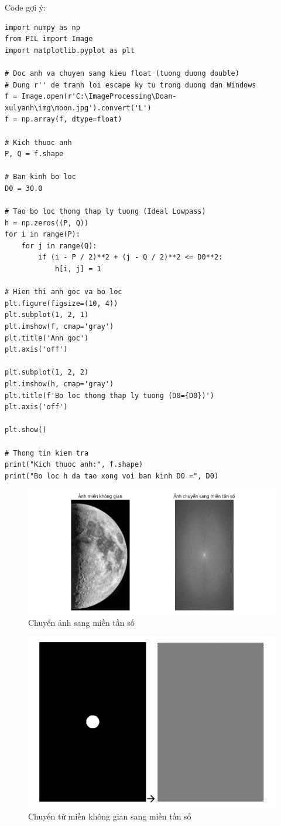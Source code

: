 \documentclass[12pt,a4paper]{report}
\numberwithin{equation}{section}
\theoremstyle{definition} %
\begin{document}
Code gợi ý: 
\begin{lstlisting}
import numpy as np
from PIL import Image
import matplotlib.pyplot as plt

# Doc anh va chuyen sang kieu float (tuong duong double)
# Dung r'' de tranh loi escape ky tu trong duong dan Windows
f = Image.open(r'C:\ImageProcessing\Doan-xulyanh\img\moon.jpg').convert('L')
f = np.array(f, dtype=float)

# Kich thuoc anh
P, Q = f.shape

# Ban kinh bo loc
D0 = 30.0

# Tao bo loc thong thap ly tuong (Ideal Lowpass)
h = np.zeros((P, Q))
for i in range(P):
    for j in range(Q):
        if (i - P / 2)**2 + (j - Q / 2)**2 <= D0**2:
            h[i, j] = 1

# Hien thi anh goc va bo loc
plt.figure(figsize=(10, 4))
plt.subplot(1, 2, 1)
plt.imshow(f, cmap='gray')
plt.title('Anh goc')
plt.axis('off')

plt.subplot(1, 2, 2)
plt.imshow(h, cmap='gray')
plt.title(f'Bo loc thong thap ly tuong (D0={D0})')
plt.axis('off')

plt.show()

# Thong tin kiem tra
print("Kich thuoc anh:", f.shape)
print("Bo loc h da tao xong voi ban kinh D0 =", D0)

\end{lstlisting}
\begin{figure}[H]
\centering
\includegraphics[width=0.9\linewidth]{img/moonFrequencydomain.png}
\caption{Chuyển ảnh sang miền tần số}
\label{fig113}
\end{figure}
\begin{figure}[H]
\centering
\includegraphics[width=0.7\linewidth]{img/mienKG_mienTS.png}
\caption{Chuyển từ miền không gian sang miền tần số}
\label{fig114}
\end{figure}
\end{document}
